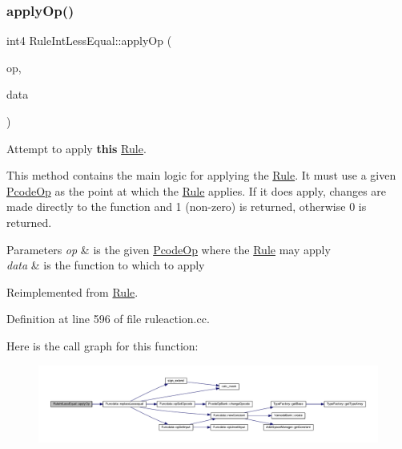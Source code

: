 \subsubsection{\texorpdfstring{applyOp()}{applyOp()}}
{\footnotesize\ttfamily int4 Rule\+Int\+Less\+Equal\+::apply\+Op (\begin{DoxyParamCaption}\item[{\mbox{\hyperlink{class_pcode_op}{Pcode\+Op}} $\ast$}]{op,  }\item[{\mbox{\hyperlink{class_funcdata}{Funcdata}} \&}]{data }\end{DoxyParamCaption})\hspace{0.3cm}{\ttfamily [virtual]}}



Attempt to apply {\bfseries{this}} \mbox{\hyperlink{class_rule}{Rule}}. 

This method contains the main logic for applying the \mbox{\hyperlink{class_rule}{Rule}}. It must use a given \mbox{\hyperlink{class_pcode_op}{Pcode\+Op}} as the point at which the \mbox{\hyperlink{class_rule}{Rule}} applies. If it does apply, changes are made directly to the function and 1 (non-\/zero) is returned, otherwise 0 is returned. 
\begin{DoxyParams}{Parameters}
{\em op} & is the given \mbox{\hyperlink{class_pcode_op}{Pcode\+Op}} where the \mbox{\hyperlink{class_rule}{Rule}} may apply \\
\hline
{\em data} & is the function to which to apply \\
\hline
\end{DoxyParams}


Reimplemented from \mbox{\hyperlink{class_rule_a4e3e61f066670175009f60fb9dc60848}{Rule}}.



Definition at line 596 of file ruleaction.\+cc.

Here is the call graph for this function\+:
\nopagebreak
\begin{figure}[H]
\begin{center}
\leavevmode
\includegraphics[width=350pt]{class_rule_int_less_equal_a94fea35e74d0c34edf0da67dd56cb8e6_cgraph}
\end{center}
\end{figure}
\mbox{\label{class_rule_int_less_equal_a81819aa711a35d88d8f0f7d9e5aad3e3}} 
